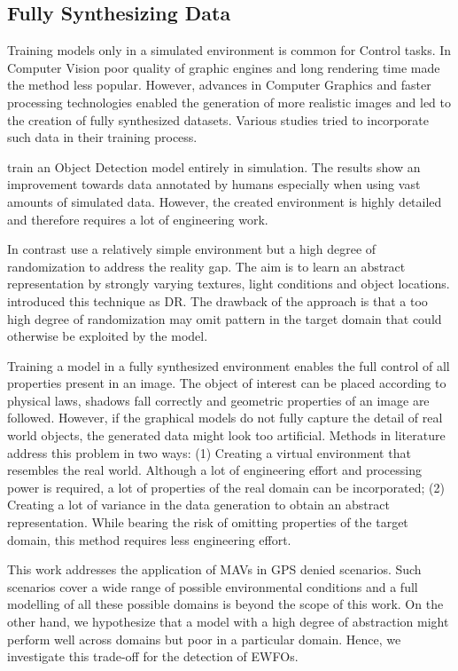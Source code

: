 \subsection{Fully Synthesizing Data}

Training models only in a simulated environment is common for Control tasks. In Computer Vision poor quality of graphic engines and long rendering time made the method less popular. However, advances in Computer Graphics and faster processing technologies enabled the generation of more realistic images and led to the creation of fully synthesized datasets\cite{Ros2016, Gaidon2016}. Various studies tried to incorporate such data in their training process.

\citeauthor{Johnson-Roberson2016} \cite{Johnson-Roberson2016} train an Object Detection model entirely in simulation. The results show an improvement towards data annotated by humans especially when using vast amounts of simulated data. However, the created environment is highly detailed and therefore requires a lot of engineering work. 

In contrast \cite{Sadeghi2016, Tobin2017, Tremblay2018a} use a relatively simple environment but a high degree of randomization to address the reality gap. The aim is to learn an abstract representation by strongly varying textures, light conditions and object locations. \citeauthor{Tobin2017} introduced this technique as \ac{DR}. The drawback of the approach is that a too high degree of randomization may omit pattern in the target domain that could otherwise be exploited by the model. 

Training a model in a fully synthesized environment enables the full control of all properties present in an image. The object of interest can be placed according to physical laws, shadows fall correctly and geometric properties of an image are followed. However, if the graphical models do not fully capture the detail of real world objects, the generated data might look too artificial. Methods in literature address this problem in two ways: (1) Creating a virtual environment that resembles the real world. Although a lot of engineering effort and processing power is required, a lot of properties of the real domain can be incorporated; (2) Creating a lot of variance in the data generation to obtain an abstract representation. While bearing the risk of omitting properties of the target domain, this method requires less engineering effort.

This work addresses the application of \acp{MAV} in \ac{GPS} denied scenarios. Such scenarios cover a wide range of possible environmental conditions and a full modelling of all these possible domains is beyond the scope of this work. On the other hand, we hypothesize that a model with a high degree of abstraction might perform well across domains but poor in a particular domain. Hence, we investigate this trade-off for the detection of \acp{EWFO}.


